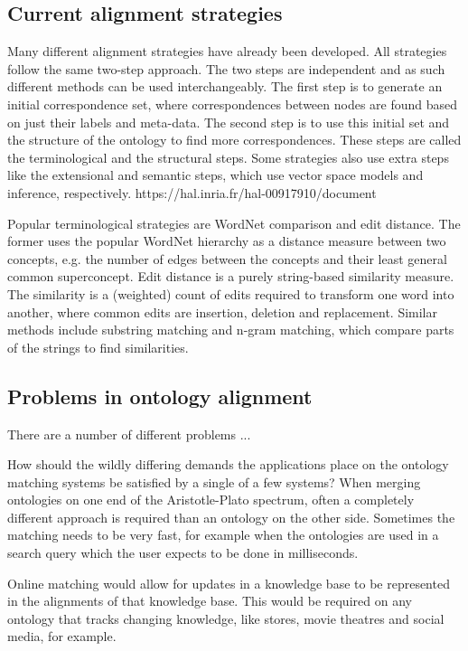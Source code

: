 \documentclass{article}
\begin{document}
 \subsection{Current alignment strategies} \label{strategies}
 Many different alignment strategies have already been developed. All strategies follow the same two-step approach. The two steps are independent and as such different methods can be used interchangeably. The first step is to generate an initial correspondence set, where correspondences between nodes are found based on just their labels and meta-data. The second step is to use this initial set and the structure of the ontology to find more correspondences. These steps are called the terminological and the structural steps. Some strategies also use extra steps like the extensional and semantic steps, which use vector space models and inference, respectively. https://hal.inria.fr/hal-00917910/document
 
 Popular terminological strategies are WordNet comparison and edit distance. The former uses the popular WordNet hierarchy as a distance measure between two concepts, e.g. the number of edges between the concepts and their least general common superconcept. \cite{lin2008}
 Edit distance is a purely string-based similarity measure. The similarity is a (weighted) count of edits required to transform one word into another, where common edits are insertion, deletion and replacement. Similar methods include substring matching and n-gram matching, which compare parts of the strings to find similarities.\cite{singh2014, levenshtein}
 \subsection{Problems in ontology alignment}
 There are a number of different problems ... %
 
 How should the wildly differing demands the applications place on the ontology matching systems be satisfied by a single of a few systems? When merging ontologies on one end of the Aristotle-Plato spectrum, often a completely different approach is required than an ontology on the other side. Sometimes the matching needs to be very fast, for example when the ontologies are used in a search query which the user expects to be done in milliseconds.
 
 Online matching would allow for updates in a knowledge base to be represented in the alignments of that knowledge base. This would be required on any ontology that tracks changing knowledge, like stores, movie theatres and social media, for example.
 
\end{document}

